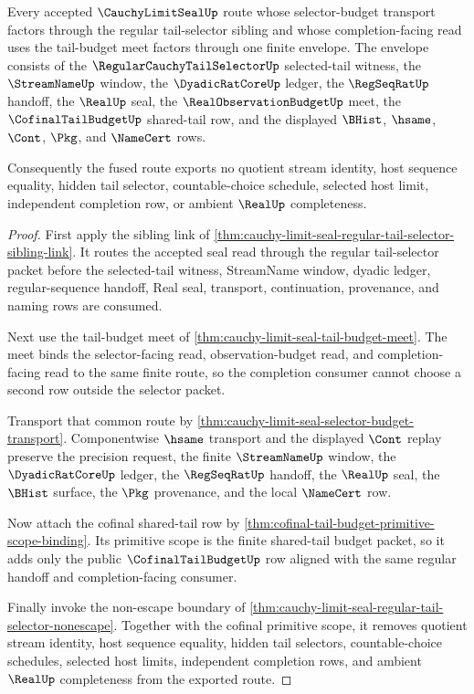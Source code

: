 \begin{theorem}
\label{thm:cauchy-limit-seal-streamname-cofinal-tail-budget-fusion}
Every accepted $\CauchyLimitSealUp$ route whose selector-budget transport factors through the regular tail-selector sibling and whose completion-facing read uses the tail-budget meet factors through one finite envelope. The envelope consists of the $\RegularCauchyTailSelectorUp$ selected-tail witness, the $\StreamNameUp$ window, the $\DyadicRatCoreUp$ ledger, the $\RegSeqRatUp$ handoff, the $\RealUp$ seal, the $\RealObservationBudgetUp$ meet, the $\CofinalTailBudgetUp$ shared-tail row, and the displayed $\BHist$, $\hsame$, $\Cont$, $\Pkg$, and $\NameCert$ rows.

Consequently the fused route exports no quotient stream identity, host sequence equality, hidden tail selector, countable-choice schedule, selected host limit, independent completion row, or ambient $\RealUp$ completeness.
\end{theorem}
\begin{proof}
First apply the sibling link of \autoref{thm:cauchy-limit-seal-regular-tail-selector-sibling-link}. It routes the accepted seal read through the regular tail-selector packet before the selected-tail witness, StreamName window, dyadic ledger, regular-sequence handoff, Real seal, transport, continuation, provenance, and naming rows are consumed.

Next use the tail-budget meet of \autoref{thm:cauchy-limit-seal-tail-budget-meet}. The meet binds the selector-facing read, observation-budget read, and completion-facing read to the same finite route, so the completion consumer cannot choose a second row outside the selector packet.

Transport that common route by \autoref{thm:cauchy-limit-seal-selector-budget-transport}. Componentwise $\hsame$ transport and the displayed $\Cont$ replay preserve the precision request, the finite $\StreamNameUp$ window, the $\DyadicRatCoreUp$ ledger, the $\RegSeqRatUp$ handoff, the $\RealUp$ seal, the $\BHist$ surface, the $\Pkg$ provenance, and the local $\NameCert$ row.

Now attach the cofinal shared-tail row by \autoref{thm:cofinal-tail-budget-primitive-scope-binding}. Its primitive scope is the finite shared-tail budget packet, so it adds only the public $\CofinalTailBudgetUp$ row aligned with the same regular handoff and completion-facing consumer.

Finally invoke the non-escape boundary of \autoref{thm:cauchy-limit-seal-regular-tail-selector-nonescape}. Together with the cofinal primitive scope, it removes quotient stream identity, host sequence equality, hidden tail selectors, countable-choice schedules, selected host limits, independent completion rows, and ambient $\RealUp$ completeness from the exported route.
\end{proof}

